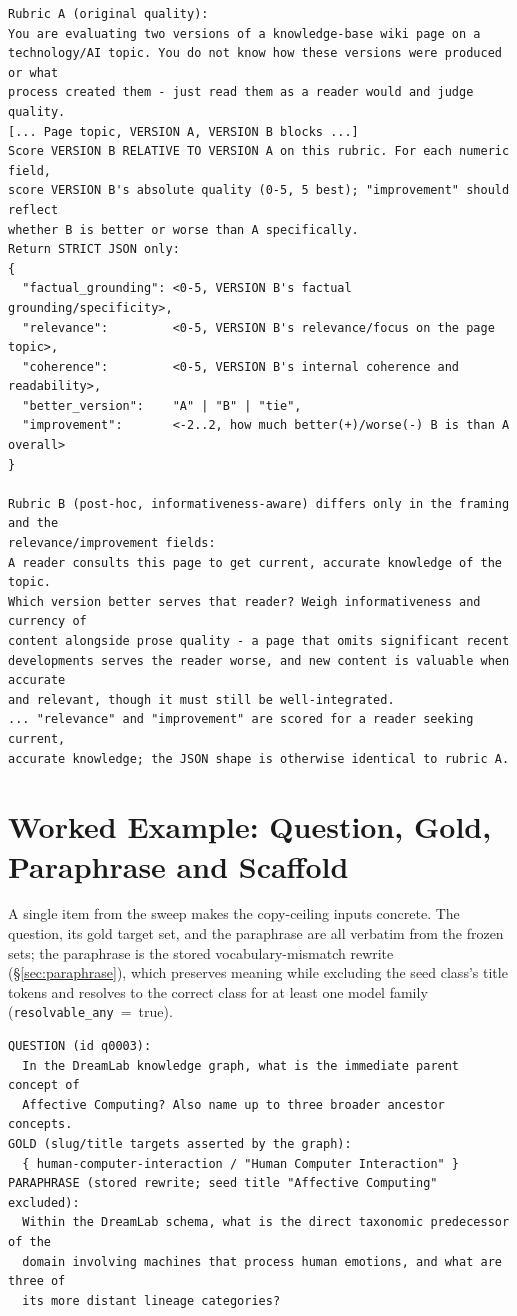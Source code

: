 \documentclass[10pt,twocolumn]{article}
\begin{document}
{\footnotesize\begin{verbatim}
Rubric A (original quality):
You are evaluating two versions of a knowledge-base wiki page on a
technology/AI topic. You do not know how these versions were produced or what
process created them - just read them as a reader would and judge quality.
[... Page topic, VERSION A, VERSION B blocks ...]
Score VERSION B RELATIVE TO VERSION A on this rubric. For each numeric field,
score VERSION B's absolute quality (0-5, 5 best); "improvement" should reflect
whether B is better or worse than A specifically.
Return STRICT JSON only:
{
  "factual_grounding": <0-5, VERSION B's factual grounding/specificity>,
  "relevance":         <0-5, VERSION B's relevance/focus on the page topic>,
  "coherence":         <0-5, VERSION B's internal coherence and readability>,
  "better_version":    "A" | "B" | "tie",
  "improvement":       <-2..2, how much better(+)/worse(-) B is than A overall>
}

Rubric B (post-hoc, informativeness-aware) differs only in the framing and the
relevance/improvement fields:
A reader consults this page to get current, accurate knowledge of the topic.
Which version better serves that reader? Weigh informativeness and currency of
content alongside prose quality - a page that omits significant recent
developments serves the reader worse, and new content is valuable when accurate
and relevant, though it must still be well-integrated.
... "relevance" and "improvement" are scored for a reader seeking current,
accurate knowledge; the JSON shape is otherwise identical to rubric A.
\end{verbatim}}

\section{Worked Example: Question, Gold, Paraphrase and Scaffold}\label{sec:appendix-samples}
A single item from the sweep makes the copy-ceiling inputs concrete. The question, its gold
target set, and the paraphrase are all verbatim from the frozen sets; the paraphrase is the
stored vocabulary-mismatch rewrite (\S\ref{sec:paraphrase}), which preserves meaning while
excluding the seed class's title tokens and resolves to the correct class for at least one
model family (\texttt{resolvable\_any}~=~true).

{\footnotesize\begin{verbatim}
QUESTION (id q0003):
  In the DreamLab knowledge graph, what is the immediate parent concept of
  Affective Computing? Also name up to three broader ancestor concepts.
GOLD (slug/title targets asserted by the graph):
  { human-computer-interaction / "Human Computer Interaction" }
PARAPHRASE (stored rewrite; seed title "Affective Computing" excluded):
  Within the DreamLab schema, what is the direct taxonomic predecessor of the
  domain involving machines that process human emotions, and what are three of
  its more distant lineage categories?
\end{verbatim}}
\end{document}
